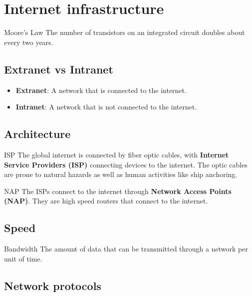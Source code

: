 

\section{Internet infrastructure}

\begin{theorem}
    {Moore's Law}
    The number of transistors on an integrated circuit doubles about every two years.
\end{theorem}

\subsection{Extranet vs Intranet}

\begin{itemize}
    \item \textbf{Extranet}: A network that is connected to the internet.
    \item \textbf{Intranet}: A network that is not connected to the internet.
\end{itemize}

\subsection{Architecture}

\begin{definition}
    {ISP}
    The global internet is connected by fiber optic cables, with \textbf{Internet Service Providers (ISP)} connecting devices to the internet. The optic cables are prone to natural hazards as well as human activities like ship anchoring.
\end{definition}

\begin{definition}
    {NAP}
    The ISPs connect to the internet through \textbf{Network Access Points (NAP)}. They are high speed routers that connect to the internet.
\end{definition}

\subsection{Speed}

\begin{definition}
    {Bandwidth}
    The amount of data that can be transmitted through a network per unit of time.
\end{definition}

\subsection{Network protocols}

